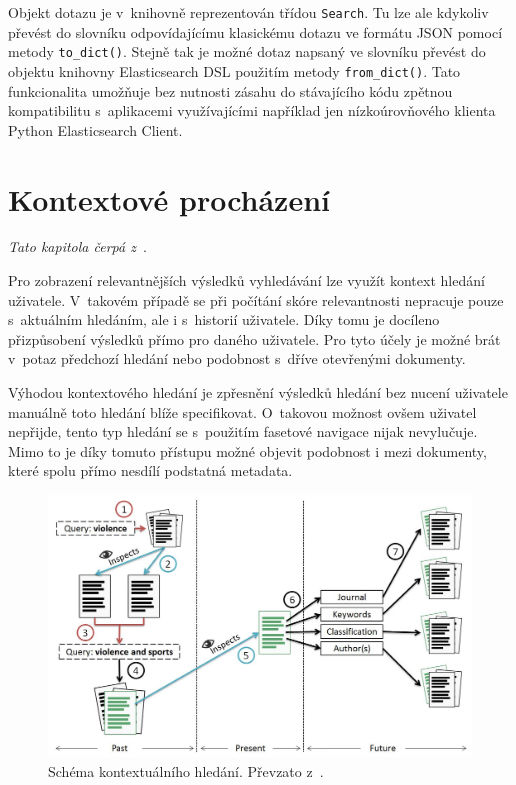 Objekt dotazu je v~knihovně reprezentován třídou \texttt{Search}. Tu lze ale kdykoliv převést do slovníku odpovídajícímu klasickému dotazu ve formátu JSON pomocí metody \texttt{to\_dict()}. Stejně tak je možné dotaz napsaný ve slovníku převést do objektu knihovny Elasticsearch DSL použitím metody \texttt{from\_dict()}. Tato funkcionalita umožňuje bez nutnosti zásahu do stávajícího kódu zpětnou kompatibilitu s~aplikacemi využívajícími například jen nízkoúrovňového klienta Python Elasticsearch Client.


\section{Kontextové procházení}
\emph{Tato kapitola čerpá z~\cite{bib:similarity-context}}.

Pro zobrazení relevantnějších výsledků vyhledávání lze využít kontext hledání uživatele. V~takovém případě se při počítání skóre relevantnosti nepracuje pouze s~aktuálním hledáním, ale i s~historií uživatele. Díky tomu je docíleno přizpůsobení výsledků přímo pro daného uživatele.
Pro tyto účely je možné brát v~potaz předchozí hledání nebo podobnost s~dříve otevřenými dokumenty.

Výhodou kontextového hledání je zpřesnění výsledků hledání bez nucení uživatele manuálně toto hledání blíže specifikovat. O~takovou možnost ovšem uživatel nepřijde, tento typ hledání se s~použitím fasetové navigace nijak nevylučuje. 
Mimo to je díky tomuto přístupu možné objevit podobnost i mezi dokumenty, které spolu přímo nesdílí podstatná metadata. 


\begin{figure}[H]
	\centering
	\includegraphics[width=\textwidth]{obrazky-figures/contextual.png}
	\caption{Schéma kontextuálního hledání. Převzato z~\cite{bib:similarity-context}.}
	\label{img:contextual}
\end{figure}

